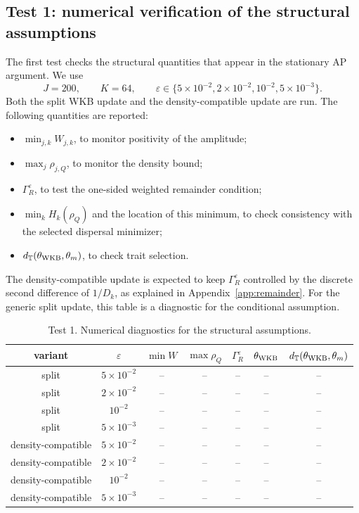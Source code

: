 \documentclass[11pt]{article}
\begin{document}
\subsection{Test 1: numerical verification of the structural assumptions}\label{subsec:test_assumptions_new}

The first test checks the structural quantities that appear in the stationary AP argument.  We use
\[
    J=200,
    \qquad
    K=64,
    \qquad
    \varepsilon\in\{5\times10^{-2},2\times10^{-2},10^{-2},5\times10^{-3}\}.
\]
Both the split WKB update and the density-compatible update are run.  The following quantities are reported:
\begin{itemize}
\item \(\min_{j,k} W_{j,k}\), to monitor positivity of the amplitude;
\item \(\max_j\rho_{j,Q}\), to monitor the density bound;
\item \(\Gamma_R^\varepsilon\), to test the one-sided weighted remainder condition;
\item \(\min_k H_k(\rho_Q)\) and the location of this minimum, to check consistency with the selected dispersal minimizer;
\item \(d_{\mathbb T}(\theta_{\rm WKB},\theta_m)\), to check trait selection.
\end{itemize}
The density-compatible update is expected to keep \(\Gamma_R^\varepsilon\) controlled by the discrete second difference of \(1/D_k\), as explained in Appendix~\ref{app:remainder}.  For the generic split update, this table is a diagnostic for the conditional assumption.

\begin{table}[ht]
\centering
\caption{Test 1. Numerical diagnostics for the structural assumptions.}
\begin{tabular}{ccccccc}
\toprule
variant & $\varepsilon$ & $\min W$ & $\max\rho_Q$ & $\Gamma_R^\varepsilon$ & $\theta_{\rm WKB}$ & $d_{\mathbb T}(\theta_{\rm WKB},\theta_m)$\\
\midrule
split & $5\times10^{-2}$ & -- & -- & -- & -- & --\\
split & $2\times10^{-2}$ & -- & -- & -- & -- & --\\
split & $10^{-2}$ & -- & -- & -- & -- & --\\
split & $5\times10^{-3}$ & -- & -- & -- & -- & --\\
density-compatible & $5\times10^{-2}$ & -- & -- & -- & -- & --\\
density-compatible & $2\times10^{-2}$ & -- & -- & -- & -- & --\\
density-compatible & $10^{-2}$ & -- & -- & -- & -- & --\\
density-compatible & $5\times10^{-3}$ & -- & -- & -- & -- & --\\
\bottomrule
\end{tabular}
\end{table}
\end{document}
